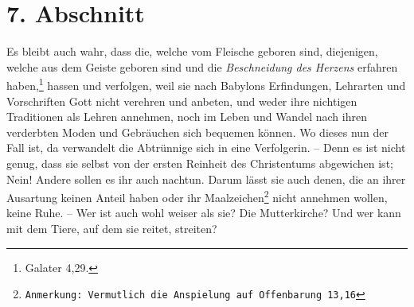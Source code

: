 \section{7. Abschnitt} \label{kap1_ab7}

Es bleibt auch wahr, dass die, welche vom Fleische geboren sind,
diejenigen, welche aus dem Geiste geboren sind und die \textit{Beschneidung des
Herzens}  erfahren haben,\footnote{Galater 4,29.}
hassen und verfolgen, weil sie nach
Babylons Erfindungen, Lehrarten und Vorschriften Gott nicht verehren und
anbeten, und weder ihre nichtigen Traditionen als Lehren annehmen, noch im Leben
und Wandel nach ihren verderbten Moden und Gebräuchen sich bequemen können.
Wo dieses nun der Fall ist, da verwandelt die Abtrünnige sich in eine
Verfolgerin.
-- Denn es ist nicht genug, dass sie selbst von der ersten Reinheit des
Christentums abgewichen ist;
Nein!
Andere sollen es ihr auch nachtun.
Darum lässt sie auch denen, die an ihrer Ausartung keinen Anteil haben oder ihr
Maalzeichen\footnote{\texttt{Anmerkung: Vermutlich die Anspielung auf Offenbarung 13,16}}
nicht annehmen wollen, keine Ruhe.
-- Wer ist auch wohl weiser als sie? Die Mutterkirche?
Und wer kann mit dem Tiere, auf dem sie reitet, streiten?

\medskip

